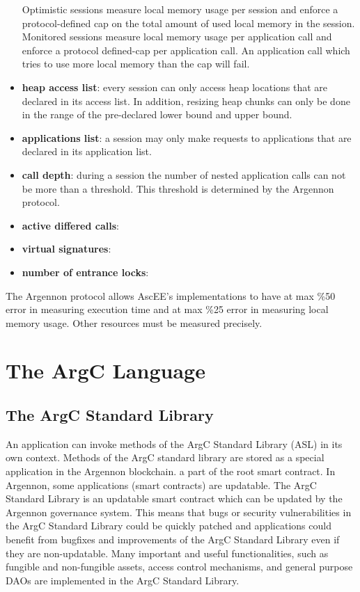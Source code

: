 \begin{itemize}
    Optimistic sessions measure local memory usage per session and enforce a protocol-defined cap on the total amount of
    used local memory in the session. Monitored sessions measure local memory usage per
    application call and enforce a protocol defined-cap per application call. An application call which tries to use
    more local memory than the cap will fail.
    \item \textbf{heap access list}:
    every session can only access heap locations that are declared in its access list. In addition,
    resizing heap chunks can only be done in the range of the pre-declared lower bound and upper bound.
    \item \textbf{applications list}:
    a session may only make requests to applications that are declared in its application list.
    \item \textbf{call depth}:
    during a session the number of nested application calls can not be more than a threshold. This threshold is
    determined by the Argennon protocol.
    \item \textbf{active differed calls}:
    \item \textbf{virtual signatures}:
    \item \textbf{number of entrance locks}:
\end{itemize}

The Argennon protocol allows AscEE's implementations to have at max \%50 error in measuring execution time and at
max \%25 error in measuring local memory usage. Other resources must be measured precisely.


\section{The ArgC Language}\label{sec:the-argc-language}

\subsection{The ArgC Standard Library}\label{sec:asl}

An application can invoke methods of the ArgC Standard Library (ASL) in its own context. Methods of the ArgC standard
library are stored as a special application in the Argennon blockchain.
a part of the root smart contract.
In Argennon, some applications (smart contracts) are updatable. The ArgC Standard Library is an updatable smart
contract which can be updated by the Argennon governance
system. This means that bugs or security vulnerabilities in the ArgC Standard Library could be quickly patched and
applications could benefit from bugfixes and improvements of the ArgC Standard Library even if they are
non-updatable. Many important and useful functionalities,
such as fungible and non-fungible assets, access control mechanisms,
and general purpose DAOs are implemented in the ArgC Standard Library.

